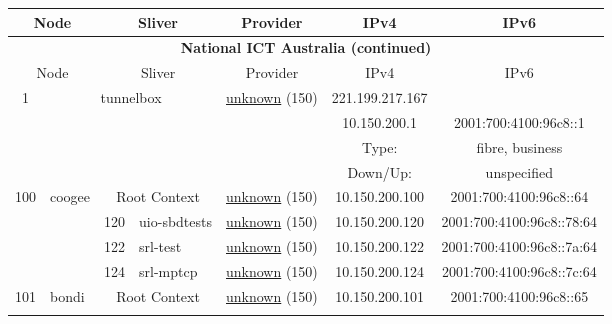 \begin{small}
\begin{center}
\begin{longtable}{|c|c|c|c|c|c|c|c|}
 \multicolumn{2}{|p{8em}|}{Node} & \multicolumn{2}{|p{8em}|}{Sliver} & \multicolumn{2}{|p{8em}|}{Provider} & IPv4 & IPv6 \\ \hline
\endfirsthead
\hline
 \multicolumn{8}{|c|}{\textbf{National ICT Australia (continued)}} \\ \hline
 \multicolumn{2}{|p{8em}|}{Node} & \multicolumn{2}{|p{8em}|}{Sliver} & \multicolumn{2}{|p{8em}|}{Provider} & IPv4 & IPv6 \\ \hline
\endhead
 \multirow{4}{*}{\tiny{1}} & \multicolumn{3}{|c|}{\multirow{4}{*}{\tiny{tunnelbox}}} & \multicolumn{2}{|c|}{\multirow{4}{*}{\tiny{\href{}{unknown} (150)}}} & \tiny{221.199.217.167} & \frownie{} \\* \cline{7-7}\cline{8-8}
  & \multicolumn{3}{|c|}{} & \multicolumn{2}{|c|}{} & \tiny{10.150.200.1} & \tiny{2001:700:4100:96c8::1} \\* \cline{7-7}\cline{8-8}
  & \multicolumn{3}{|c|}{} & \multicolumn{2}{|c|}{} & Type: & fibre, business \\* \cline{7-7}\cline{8-8}
  & \multicolumn{3}{|c|}{} & \multicolumn{2}{|c|}{} & Down/Up:  & unspecified \\ \hline
 \multirow{4}{*}{\tiny{100}} & \multicolumn{1}{|l|}{\multirow{4}{*}{\tiny{coogee}}} & \multicolumn{2}{|c|}{\tiny{Root Context}} & \multicolumn{2}{|c|}{\tiny{\href{}{unknown} (150)}} & \tiny{10.150.200.100} & \tiny{2001:700:4100:96c8::64} \\* \cline{3-3}\cline{4-4}\cline{5-5}\cline{6-6}\cline{7-7}\cline{8-8}
  &  & \tiny{120} & \multicolumn{1}{|l|}{\tiny{uio-sbdtests}} & \multicolumn{2}{|c|}{\tiny{\href{}{unknown} (150)}} & \tiny{10.150.200.120} & \tiny{2001:700:4100:96c8::78:64} \\* \cline{3-3}\cline{4-4}\cline{5-5}\cline{6-6}\cline{7-7}\cline{8-8}
  &  & \tiny{122} & \multicolumn{1}{|l|}{\tiny{srl-test}} & \multicolumn{2}{|c|}{\tiny{\href{}{unknown} (150)}} & \tiny{10.150.200.122} & \tiny{2001:700:4100:96c8::7a:64} \\* \cline{3-3}\cline{4-4}\cline{5-5}\cline{6-6}\cline{7-7}\cline{8-8}
  &  & \tiny{124} & \multicolumn{1}{|l|}{\tiny{srl-mptcp}} & \multicolumn{2}{|c|}{\tiny{\href{}{unknown} (150)}} & \tiny{10.150.200.124} & \tiny{2001:700:4100:96c8::7c:64} \\ \hline
 \multirow{4}{*}{\tiny{101}} & \multicolumn{1}{|l|}{\multirow{4}{*}{\tiny{bondi}}} & \multicolumn{2}{|c|}{\tiny{Root Context}} & \multicolumn{2}{|c|}{\tiny{\href{}{unknown} (150)}} & \tiny{10.150.200.101} & \tiny{2001:700:4100:96c8::65} \\* \cline{3-3}\cline{4-4}\cline{5-5}\cline{6-6}\cline{7-7}\cline{8-8}

\end{longtable}
\end{center}
\end{small}
